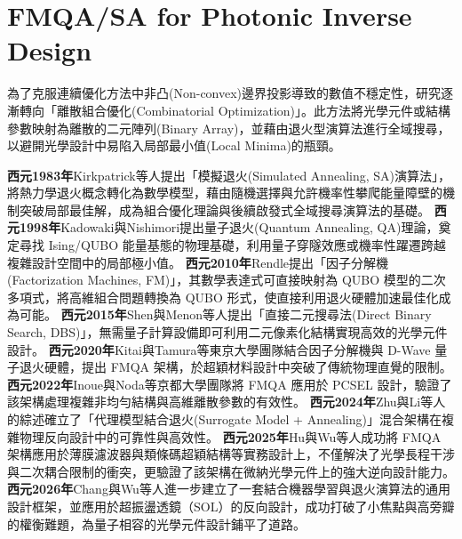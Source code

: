 \section{FMQA/SA for Photonic Inverse Design}
為了克服連續優化方法中非凸(Non-convex)邊界投影導致的數值不穩定性，研究逐漸轉向「離散組合優化(Combinatorial Optimization)」。此方法將光學元件或結構參數映射為離散的二元陣列(Binary Array)，並藉由退火型演算法進行全域搜尋，以避開光學設計中易陷入局部最小值(Local Minima)的瓶頸。\

\cite{kirkpatrick1983_simulated_annealing}\textbf{西元1983年}Kirkpatrick等人提出「模擬退火(Simulated Annealing, SA)演算法」，將熱力學退火概念轉化為數學模型，藉由隨機選擇與允許機率性攀爬能量障壁的機制突破局部最佳解，成為組合優化理論與後續啟發式全域搜尋演算法的基礎。
\cite{kadowaki1998_quantum_annealing}\textbf{西元1998年}Kadowaki與Nishimori提出量子退火(Quantum Annealing, QA)理論，奠定尋找 Ising/QUBO 能量基態的物理基礎，利用量子穿隧效應或機率性躍遷跨越複雜設計空間中的局部極小值。
\cite{rendle2010_factorization}\textbf{西元2010年}Rendle提出「因子分解機(Factorization Machines, FM)」，其數學表達式可直接映射為 QUBO 模型的二次多項式，將高維組合問題轉換為 QUBO 形式，使直接利用退火硬體加速最佳化成為可能。
\cite{shen2015_integrated_pbs}\textbf{西元2015年}Shen與Menon等人提出「直接二元搜尋法(Direct Binary Search, DBS)」，無需量子計算設備即可利用二元像素化結構實現高效的光學元件設計。
\cite{kitai2020_fmqa}\textbf{西元2020年}Kitai與Tamura等東京大學團隊結合因子分解機與 D-Wave 量子退火硬體，提出 FMQA 架構，於超穎材料設計中突破了傳統物理直覺的限制。
\cite{inoue2022_fmqa_pcsel}\textbf{西元2022年}Inoue與Noda等京都大學團隊將 FMQA 應用於 PCSEL 設計，驗證了該架構處理複雜非均勻結構與高維離散參數的有效性。
\cite{zhu2024_machine_learning}\textbf{西元2024年}Zhu與Li等人的綜述確立了「代理模型結合退火(Surrogate Model + Annealing)」混合架構在複雜物理反向設計中的可靠性與高效性。
\cite{hu2025_optical_filter}\textbf{西元2025年}Hu與Wu等人成功將 FMQA 架構應用於薄膜濾波器與類條碼超穎結構等實務設計上，不僅解決了光學長程干涉與二次耦合限制的衝突，更驗證了該架構在微納光學元件上的強大逆向設計能力。
\cite{chang2026_quantum_compatible}\textbf{西元2026年}Chang與Wu等人進一步建立了一套結合機器學習與退火演算法的通用設計框架，並應用於超振盪透鏡（SOL）的反向設計，成功打破了小焦點與高旁瓣的權衡難題，為量子相容的光學元件設計鋪平了道路。

